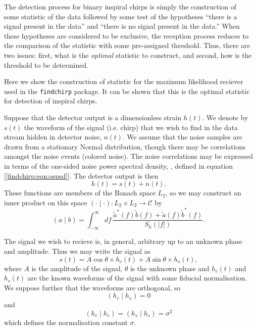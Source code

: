 The detection process for binary inspiral chirps is simply the construction of
some statistic of the data followed by some test of the hypotheses ``there is
a signal present in the data'' and ``there is no signal present in the data.''
When these hypotheses are considered to be exclusive, the reception process
reduces to the comparison of the statistic with some pre-assigned threshold.
Thus, there are two issues: first, what is the \emph{optimal} statistic to
construct, and second, how is the threshold to be determined.

Here we show the construction of statistic for the maximum likelihood reciever
used in the \texttt{findchirp} package. It can be shown \cite{wz} that this is
the optimal statistic for detection of inspiral chirps.

Suppose that the detector output is a dimensionless strain $h(t)$. We denote
by $s(t)$ the waveform of the signal (i.e. chirp) that we wish to find in the
data stream hidden in detector noise, $n(t)$. We assume that the noise samples
are drawn from a stationary Normal distribution, though there may be
correlations amongst the noise events (colored noise). The noise correlations
may be expressed in terms of the one-sided noise power spectral density,
\ospsd, defined in equation [\ref{findchirp:eqn:ospsd}]. The detector output
is then
\begin{equation}
h(t) = s(t) + n(t).
\end{equation}
These functions are members of the Banach space $L_2$, so we may construct an
inner product on this space $(\cdot\mid\cdot) : L_2 \times L_2 \rightarrow
\mathcal{C}$ by
\begin{equation}
  (a\mid b) = \int_{-\infty}^\infty df\,
  \frac{\tilde{a}^\ast(f)\tilde{b}(f)+\tilde{a}(f)\tilde{b}^\ast(f)}
       {S_h(|f|)}.
\end{equation}

The signal we wish to recieve is, in general, arbitrary up to an unknown phase
and amplitude. Thus we may write the signal as
\begin{equation}
s(t)=A\cos\theta\times h_c(t)+A\sin\theta\times h_s(t),
\end{equation}
where $A$ is the amplitude of the signal, $\theta$ is the unknown phase and
$h_c(t)$ and $h_s(t)$ are the known waveforms of the signal with some fiducial
normalisation. We suppose further that the waveforms are orthogonal, so
\begin{equation}
\left(h_c\mid h_s\right) = 0
\end{equation}
and
\begin{equation}
\left(h_c\mid h_c\right) = \left(h_s\mid h_s\right) = \sigma^2
\end{equation}
which defines the normalisation constant $\sigma$.

